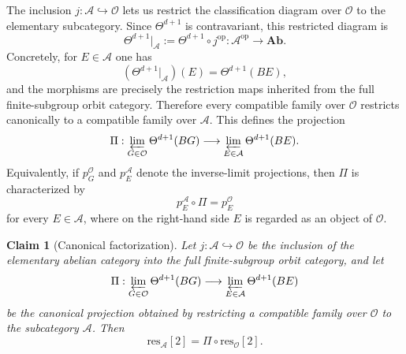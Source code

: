 \documentclass[aps,prx,reprint,superscriptaddress,twocolumn,amsmath,amssymb,amsfonts, nofootinbib]{revtex4-2}
\newcommand{\res}{\text{res}}
\theoremstyle{apsstyle}
\newtheorem{claim}{Claim}
\begin{document}
\bigskip 

The inclusion $j:\mathcal A\hookrightarrow \mathcal O$ lets us restrict the classification diagram over $\mathcal O$ to the elementary subcategory. Since $\Theta^{d+1}$ is contravariant, this restricted diagram is
\begin{equation}
\Theta^{d+1}\vert_{\mathcal A} := \Theta^{d+1}\circ j^{\mathrm{op}}: \mathcal A^{\mathrm{op}}\longrightarrow \mathbf{Ab}.
\end{equation}
Concretely, for $E\in\mathcal A$ one has
\begin{equation}
(\Theta^{d+1}\vert_{\mathcal A})(E)=\Theta^{d+1}(BE),
\end{equation}
and the morphisms are precisely the restriction maps inherited from the full finite-subgroup orbit category. Therefore every compatible family over $\mathcal O$ restricts canonically to a compatible family over $\mathcal A$. This defines the projection
\begin{equation}
\Pi: \varprojlim_{G\in\mathcal O}\Theta^{d+1}(BG)
\longrightarrow \varprojlim_{E\in\mathcal A}\Theta^{d+1}(BE).
\end{equation}
Equivalently, if $p_G^{\mathcal O}$ and $p_E^{\mathcal A}$ denote the inverse-limit projections, then $\Pi$ is characterized by
\begin{equation}
p_E^{\mathcal A}\circ \Pi
=
p_E^{\mathcal O}
\end{equation}
for every $E\in\mathcal A$, where on the right-hand side $E$ is regarded as an object of $\mathcal O$.

\begin{claim}[Canonical factorization]
\label{claim:canonical_factorization_res}
Let $j:\mathcal A\hookrightarrow \mathcal O$ be the inclusion of the elementary abelian category into the full finite-subgroup orbit category, and let
\begin{equation}
\Pi:
\varprojlim_{G\in\mathcal O}\Theta^{d+1}(BG)
\longrightarrow
\varprojlim_{E\in\mathcal A}\Theta^{d+1}(BE)
\end{equation}
be the canonical projection obtained by restricting a compatible family over $\mathcal O$ to the subcategory $\mathcal A$. Then
\begin{equation}
\res_{\mathcal A}[2]
=
\Pi\circ \res_{\mathcal O}[2].
\end{equation}
\end{claim}
\end{document}
